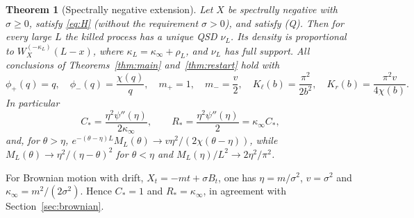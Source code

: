 \documentclass[11pt,a4paper]{article}
\newtheorem{theorem}{Theorem}[section]
\theoremstyle{definition}
\theoremstyle{remark}
\newcommand{\1}{\mathbf 1}
\newcommand{\Kl}{K_{\ell}}
\newcommand{\Kr}{K_{r}}
\begin{document}
\begin{theorem}[Spectrally negative extension]\label{thm:sn}
Let $X$ be spectrally negative with $\sigma\ge0$, satisfy \eqref{eq:H} (without the requirement $\sigma>0$), and satisfy (Q). Then for every large $L$ the killed process has a unique QSD $\nu_L$. Its density is proportional to $W_X^{(-\kappa_L)}(L-x)$, where $\kappa_L=\kappa_\infty+\rho_L$, and $\nu_L$ has full support. All conclusions of Theorems~\ref{thm:main} and~\ref{thm:restart} hold with
\[
 \phi_+(q)=q,\quad \phi_-(q)=\frac{\chi(q)}q,\quad m_+=1,\quad m_-=\frac v2,\quad
 \Kl(b)=\frac{\pi^2}{2b^2},\quad \Kr(b)=\frac{\pi^2v}{4\chi(b)}.
\]
In particular
\[
 C_*=\frac{\eta^2\psi''(\eta)}{2\kappa_\infty},\qquad
 R_*=\frac{\eta^2\psi''(\eta)}2=\kappa_\infty C_*,
\]
and, for $\theta>\eta$, $e^{-(\theta-\eta)L}M_L(\theta)\to v\eta^2/(2\chi(\theta-\eta))$, while $M_L(\theta)\to\eta^2/(\eta-\theta)^2$ for $\theta<\eta$ and $M_L(\eta)/L^2\to2\eta^2/\pi^2$.
\end{theorem}

For Brownian motion with drift, $X_t=-mt+\sigma B_t$, one has $\eta=m/\sigma^2$, $v=\sigma^2$ and $\kappa_\infty=m^2/(2\sigma^2)$. Hence $C_*=1$ and $R_*=\kappa_\infty$, in agreement with Section~\ref{sec:brownian}.
\end{document}

